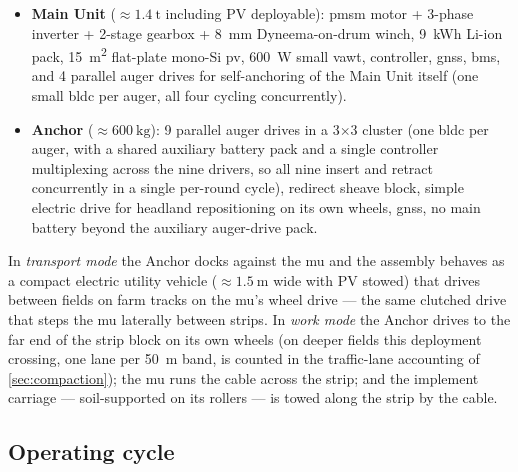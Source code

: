 \documentclass[11pt,a4paper]{article}
\begin{document}
\begin{itemize}[leftmargin=1.6em,itemsep=0.15em]
    \item \textbf{Main Unit} (${\approx}\SI{1.4}{\tonne}$ including PV deployable): \gls{pmsm} motor + 3-phase inverter + 2-stage gearbox + \SI{8}{\milli\meter} Dyneema-on-drum winch, \SI{9}{\kWh} Li-ion pack, \SI{15}{\meter\squared} flat-plate mono-Si \gls{pv}, \SI{600}{\watt} small \gls{vawt}, controller, \gls{gnss}, \gls{bms}, and 4 parallel auger drives for self-anchoring of the Main Unit itself (one small \gls{bldc} per auger, all four cycling concurrently).
    \item \textbf{Anchor} (${\approx}\SI{600}{\kilogram}$): 9 parallel auger drives in a 3$\times$3 cluster (one \gls{bldc} per auger, with a shared auxiliary battery pack and a single controller multiplexing across the nine drivers, so all nine insert and retract concurrently in a single per-round cycle), redirect sheave block, simple electric drive for headland repositioning on its own wheels, \gls{gnss}, no main battery beyond the auxiliary auger-drive pack.
\end{itemize}

In \emph{transport mode} the Anchor docks against the \gls{mu} and the assembly behaves as a compact electric utility vehicle (${\approx}\SI{1.5}{\meter}$ wide with PV stowed) that drives between fields on farm tracks on the \gls{mu}'s wheel drive --- the same clutched drive that steps the \gls{mu} laterally between strips. In \emph{work mode} the Anchor drives to the far end of the strip block on its own wheels (on deeper fields this deployment crossing, one lane per \SI{50}{\meter} band, is counted in the traffic-lane accounting of \cref{sec:compaction}); the \gls{mu} runs the cable across the strip; and the implement carriage --- soil-supported on its rollers --- is towed along the strip by the cable.

\subsection{Operating cycle}\label{sec:cycle}
\end{document}
